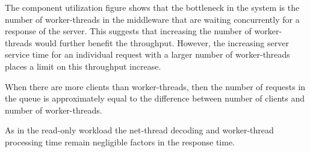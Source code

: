 \documentclass[report.tex]{subfiles}
\begin{document}
The component utilization figure shows that the bottleneck in the system is the number of worker-threads in the middleware that are waiting concurrently for a response of the server. This suggests that increasing the number of worker-threads would further benefit the throughput. However, the increasing server service time for an individual request with a larger number of worker-threads places a limit on this throughput increase.

When there are more clients than worker-threads, then the number of requests in the queue is approximately equal to the difference between number of clients and number of worker-threads.

As in the read-only workload the net-thread decoding and worker-thread processing time remain negligible factors in the response time.
\end{document}
